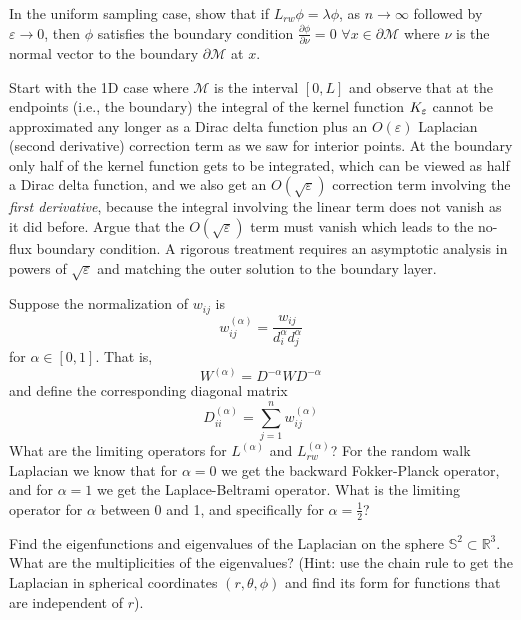 \begin{myexercise}
In the uniform sampling case, show that if $L_{rw}\phi = \lambda \phi$, as $n\rightarrow \infty$ followed by $\varepsilon \to 0$, then $\phi$ satisfies the boundary condition $\frac{\partial \phi}{\partial \nu} = 0$ $\forall x \in \partial \mathcal{M}$ where $\nu$ is the normal vector to the boundary $\partial \mathcal{M}$ at $x$.\\
\begin{hint}
Start with the 1D case where $\mathcal{M}$ is the interval $[0,L]$ and observe that at the endpoints (i.e., the boundary) the integral of the kernel function $K_{\varepsilon}$ cannot be approximated any longer as a Dirac delta function plus an $O(\varepsilon)$ Laplacian (second derivative) correction term as we saw for interior points. At the boundary only half of the kernel function gets to be integrated, which can be viewed as half a Dirac delta function, and we also get an $O(\sqrt{\varepsilon})$ correction term involving the {\em first derivative}, because the integral involving the linear term does not vanish as it did before. Argue that the $O(\sqrt{\varepsilon})$ term must vanish which leads to the no-flux boundary condition. A rigorous treatment requires an asymptotic analysis in powers of $\sqrt{\varepsilon}$ and matching the outer solution to the boundary layer.   
\end{hint}    
\end{myexercise}

\begin{myexercise}
Suppose the normalization of $w_{ij}$ is
\[
w_{ij}^{(\alpha)} = \frac{w_{ij}}{d_i^\alpha d_j^\alpha}
\]
for $\alpha \in [0,1]$. That is,
$$W^{(\alpha)} = D^{-\alpha} W D^{-\alpha}$$
and define the corresponding diagonal matrix
$$D^{(\alpha)}_{ii} = \sum_{j=1}^n w^{(\alpha)}_{ij}$$
What are the limiting operators for $L^{(\alpha)}$ and $L_{rw}^{(\alpha)}$?
For the random walk Laplacian we know that for $\alpha=0$ we get the backward Fokker-Planck operator, and for $\alpha=1$ we get the Laplace-Beltrami operator. What is the limiting operator for $\alpha$ between 0 and 1, and specifically for $\alpha=\frac{1}{2}$?  
\end{myexercise}

\begin{myexercise}
Find the eigenfunctions and eigenvalues of the Laplacian on the sphere $\mathbb{S}^2 \subset \mathbb{R}^3$.
 What are the multiplicities of the eigenvalues? (Hint: use the chain rule to get the Laplacian in spherical coordinates $(r,\theta,\phi)$ and find its form for functions that are independent of $r$).    
\end{myexercise}

